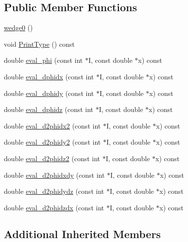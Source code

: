 \subsection*{Public Member Functions}
\begin{DoxyCompactItemize}
\item 
\mbox{\hyperlink{classfemus_1_1wedge0_abd8e339f84098255d9f7917b13349049}{wedge0}} ()
\item 
void \mbox{\hyperlink{classfemus_1_1wedge0_a83944aac1c4b6b97d8fd980c5a68f4d3}{Print\+Type}} () const
\item 
double \mbox{\hyperlink{classfemus_1_1wedge0_a8ef4bce6068f2c45e922dea7ee104121}{eval\+\_\+phi}} (const int $\ast$I, const double $\ast$x) const
\item 
double \mbox{\hyperlink{classfemus_1_1wedge0_aa56d06d2f457dc2d60c89343fadac77b}{eval\+\_\+dphidx}} (const int $\ast$I, const double $\ast$x) const
\item 
double \mbox{\hyperlink{classfemus_1_1wedge0_a9af38b6f15d958fb88a422be0955142d}{eval\+\_\+dphidy}} (const int $\ast$I, const double $\ast$x) const
\item 
double \mbox{\hyperlink{classfemus_1_1wedge0_ae0c76353c2f04e9fad1083a80a643b57}{eval\+\_\+dphidz}} (const int $\ast$I, const double $\ast$x) const
\item 
double \mbox{\hyperlink{classfemus_1_1wedge0_ab6d8e56e02ffedc90f9630db2dd37427}{eval\+\_\+d2phidx2}} (const int $\ast$I, const double $\ast$x) const
\item 
double \mbox{\hyperlink{classfemus_1_1wedge0_a0e24923793d43732b2b3913c8c94a9dd}{eval\+\_\+d2phidy2}} (const int $\ast$I, const double $\ast$x) const
\item 
double \mbox{\hyperlink{classfemus_1_1wedge0_abdda569dd9042829c15483e9c2000be4}{eval\+\_\+d2phidz2}} (const int $\ast$I, const double $\ast$x) const
\item 
double \mbox{\hyperlink{classfemus_1_1wedge0_a2453f7ad8629c94abf9001ac43eb495f}{eval\+\_\+d2phidxdy}} (const int $\ast$I, const double $\ast$x) const
\item 
double \mbox{\hyperlink{classfemus_1_1wedge0_a8b230fe06bdf7e089010f19ac81f6e64}{eval\+\_\+d2phidydz}} (const int $\ast$I, const double $\ast$x) const
\item 
double \mbox{\hyperlink{classfemus_1_1wedge0_a7ca29b396daf72718fc2a700b52410f0}{eval\+\_\+d2phidzdx}} (const int $\ast$I, const double $\ast$x) const
\end{DoxyCompactItemize}
\subsection*{Additional Inherited Members}


